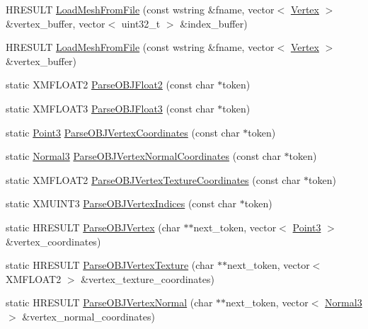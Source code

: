\begin{DoxyCompactItemize}
\item 
H\+R\+E\+S\+U\+LT \hyperlink{namespacemage_af7a4b8ecd8f1577f9de2fe0aa4c19d07}{Load\+Mesh\+From\+File} (const wstring \&fname, vector$<$ \hyperlink{structmage_1_1_vertex}{Vertex} $>$ \&vertex\+\_\+buffer, vector$<$ uint32\+\_\+t $>$ \&index\+\_\+buffer)
\item 
H\+R\+E\+S\+U\+LT \hyperlink{namespacemage_aeb896e079e2219b3e0d15c510822667c}{Load\+Mesh\+From\+File} (const wstring \&fname, vector$<$ \hyperlink{structmage_1_1_vertex}{Vertex} $>$ \&vertex\+\_\+buffer)
\item 
static X\+M\+F\+L\+O\+A\+T2 \hyperlink{namespacemage_a67f3c57c7dcc1ad50c7a8f5167d50b64}{Parse\+O\+B\+J\+Float2} (const char $\ast$token)
\item 
static X\+M\+F\+L\+O\+A\+T3 \hyperlink{namespacemage_a926f2772c637d2b5c839a936cd8dbdd1}{Parse\+O\+B\+J\+Float3} (const char $\ast$token)
\item 
static \hyperlink{structmage_1_1_point3}{Point3} \hyperlink{namespacemage_a6d1303703ffe653e7cbe67c66d120fa1}{Parse\+O\+B\+J\+Vertex\+Coordinates} (const char $\ast$token)
\item 
static \hyperlink{structmage_1_1_normal3}{Normal3} \hyperlink{namespacemage_ae0f7057c0ee72cda02b499c9d4647be0}{Parse\+O\+B\+J\+Vertex\+Normal\+Coordinates} (const char $\ast$token)
\item 
static X\+M\+F\+L\+O\+A\+T2 \hyperlink{namespacemage_a97780c7deeb5a5923b0d6665732e132d}{Parse\+O\+B\+J\+Vertex\+Texture\+Coordinates} (const char $\ast$token)
\item 
static X\+M\+U\+I\+N\+T3 \hyperlink{namespacemage_afe94a043cb3be4de3549098b7ad7a326}{Parse\+O\+B\+J\+Vertex\+Indices} (const char $\ast$token)
\item 
static H\+R\+E\+S\+U\+LT \hyperlink{namespacemage_a62daade0727c8a1bc406f5ceb378cc4f}{Parse\+O\+B\+J\+Vertex} (char $\ast$$\ast$next\+\_\+token, vector$<$ \hyperlink{structmage_1_1_point3}{Point3} $>$ \&vertex\+\_\+coordinates)
\item 
static H\+R\+E\+S\+U\+LT \hyperlink{namespacemage_a8ffd4094ac940ff129fccb6d77c1f353}{Parse\+O\+B\+J\+Vertex\+Texture} (char $\ast$$\ast$next\+\_\+token, vector$<$ X\+M\+F\+L\+O\+A\+T2 $>$ \&vertex\+\_\+texture\+\_\+coordinates)
\item 
static H\+R\+E\+S\+U\+LT \hyperlink{namespacemage_a7fafd0a6eb151bf7a6473603f096adb8}{Parse\+O\+B\+J\+Vertex\+Normal} (char $\ast$$\ast$next\+\_\+token, vector$<$ \hyperlink{structmage_1_1_normal3}{Normal3} $>$ \&vertex\+\_\+normal\+\_\+coordinates)
$$
\end{DoxyCompactItemize}
